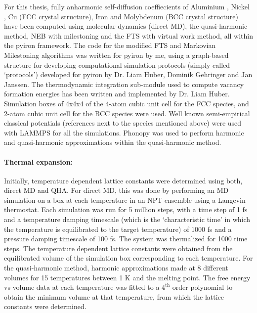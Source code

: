\documentclass{article}
\begin{document}
For this thesis, fully anharmonic self-diffusion coeffiecients of Aluminium \cite{Mendelev2009a}, Nickel \cite{Mishin2004}, Cu \cite{Mendelev2008} (FCC crystal structure), Iron \cite{Ackland1997} and Molybdenum \cite{Zhou2004} (BCC crystal structure) have been computed using molecular dynamics (direct MD), the quasi-harmonic method, NEB with milestoning and the FTS with virtual work method, all within the pyiron framework. The code for the modified FTS and Markovian Milestoning algorithms was written for pyiron by me, using a graph-based structure for developing computational simulation protocols (simply called \enquote*{protocols}) developed for pyiron by Dr. Liam Huber, Dominik Gehringer and Jan Janssen. The thermodynamic integration sub-module used to compute vacancy formation energies has been written and implemented by Dr. Liam Huber. \\

\noindent Simulation boxes of 4x4x4 of the 4-atom cubic unit cell for the FCC species, and 2-atom cubic unit cell for the BCC species were used. Well known semi-empirical classical potentials (references next to the species mentioned above) were used with LAMMPS for all the simulations. Phonopy \cite{Togo2015} was used to perform harmonic and quasi-harmonic approximations within the quasi-harmonic method.

\paragraph*{Thermal expansion:}

Initially, temperature dependent lattice constants were determined using both, direct MD and QHA. For direct MD, this was done by performing an MD simulation on a box at each temperature in an NPT ensemble using a Langevin thermostat. Each simulation was run for 5 million steps, with a time step of 1 fs and a temperature damping timescale (which is the \enquote*{characteristic time} in which the temperature is equilibrated to the target temperature) of 1000 fs and a pressure damping timescale of 100 fs. The system was thermalized for 1000 time steps. The temperature dependent lattice constants were obtained from the equilibrated volume of the simulation box corresponding to each temperature. For the quasi-harmonic method, harmonic approximations made at 8 different volumes for 15 temperatures between 1 K and the melting point. The free energy vs volume data at each temperature was fitted to a $4^{\mathrm{th}}$ order polynomial to obtain the minimum volume at that temperature, from which the lattice constants were determined. 
\end{document}
